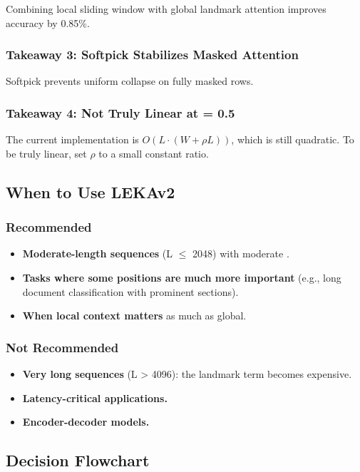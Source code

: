 Combining local sliding window with global landmark attention improves 
accuracy by 0.85\%.

\subsubsection{Takeaway 3: Softpick Stabilizes Masked Attention}

Softpick prevents uniform collapse on fully masked rows.

\subsubsection{Takeaway 4: Not Truly Linear at   = 0.5}

The current implementation is $O(L \cdot (W + \rho L))$, which is 
still quadratic. To be truly linear, set $\rho$ to a small constant 
ratio.

\subsection{When to Use LEKAv2}

\subsubsection{Recommended}
\begin{itemize}
\item \textbf{Moderate-length sequences} (L $\le$ 2048) with moderate  .
\item \textbf{Tasks where some positions are much more important} (e.g., long
  document classification with prominent sections).
\item \textbf{When local context matters} as much as global.

\end{itemize}
\subsubsection{Not Recommended}
\begin{itemize}
\item \textbf{Very long sequences} (L > 4096): the landmark term becomes expensive.
\item \textbf{Latency-critical applications.}
\item \textbf{Encoder-decoder models.}

\end{itemize}
\subsection{Decision Flowchart}

